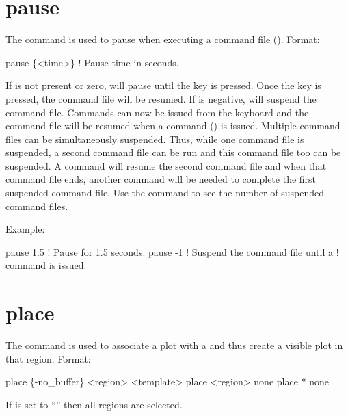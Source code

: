 \section{pause}
\label{s:pause}

The  command is used to pause \tao when executing a command file
(). Format:
\begin{example}
  pause \{<time>\} ! Pause time in seconds.
\end{example}
\vskip 10pt

If  is not present or zero, \tao will pause until the  key is pressed. Once the
 key is pressed, the command file will be resumed. If  is negative, \tao will
suspend the command file. Commands can now be issued from the keyboard and the command file will be
resumed when a  command () is issued. Multiple command files can be
simultaneously suspended.  Thus, while one command file is suspended, a second command file can be
run and this command file too can be suspended. A  command will resume the second
command file and when that command file ends, another  command will be needed to
complete the first suspended command file. Use the  command to see the number of
suspended command files.

Example:
\begin{example}
  pause 1.5    ! Pause for 1.5 seconds.
  pause -1     ! Suspend the command file until a  
               !   command is issued.
\end{example}

\section{place}
\label{s:place}

The  command is used to associate a  plot with a 
and thus create a visible plot in that region. Format:
\begin{example}
  place \{-no_buffer\} <region> <template>
  place <region> none
  place * none
\end{example}

\vskip 10pt 

If  is set to ``\vn{*}'' then all regions are selected.


